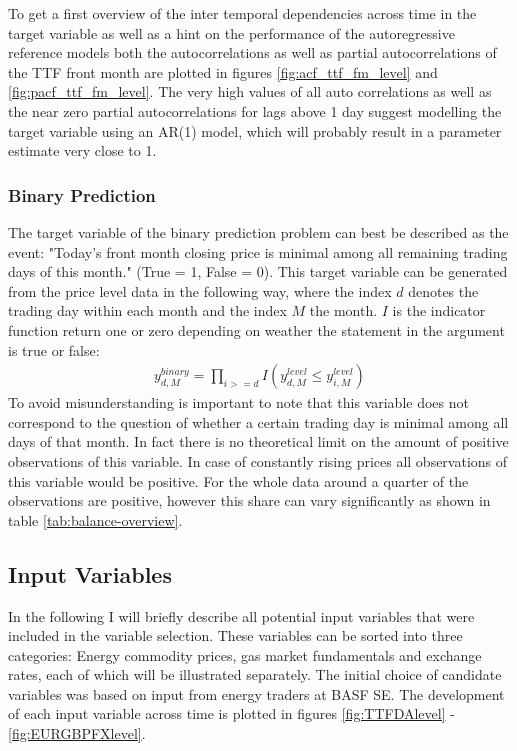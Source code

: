 To get a first overview of the inter temporal dependencies across time in the target variable as well as a hint on the performance of the autoregressive reference models both the autocorrelations  as well as partial autocorrelations of the TTF front month are plotted in figures \ref{fig:acf_ttf_fm_level} and \ref{fig:pacf_ttf_fm_level}. The very high values of all auto correlations as well as the near zero partial autocorrelations for lags above 1 day suggest modelling the target variable using an AR(1) model, which will probably result in a parameter estimate very close to 1. 

\subsubsection{Binary Prediction}
The target variable of the binary prediction problem can best be described as the event: "Today's front month closing price is minimal among all remaining trading days of this month." (True = 1, False = 0). This target variable can be generated from the price level data in the following way, where the index $d$ denotes the trading day within each month and the index $M$ the month. $I$ is the indicator function return one or zero depending on weather the statement in the argument is true or false:
\begin{align*}
y_{d,M}^{binary} = \prod_{i >= d} I(y_{d,M}^{level} \leq y_{i,M}^{level})
\end{align*}
To avoid misunderstanding is important to note that this variable does not correspond to the question of whether a certain trading day is minimal among all days of that month. In fact there is no theoretical limit on the amount of positive observations of this variable. In case of constantly rising prices all observations of this variable would be positive. For the whole data around a quarter of the observations are positive, however this share can vary significantly as shown in table \ref{tab:balance-overview}.

\subsection{Input Variables}\label{Sec:Input}
In the following I will briefly describe all potential input variables that were included in the variable selection. These variables can be sorted into three categories: Energy commodity prices, gas market fundamentals and exchange rates, each of which will be illustrated separately. The initial choice of candidate variables was based on input from energy traders at BASF SE. The development of each input variable across time is plotted in figures  \ref{fig:TTFDAlevel} - \ref{fig:EURGBPFXlevel}.
